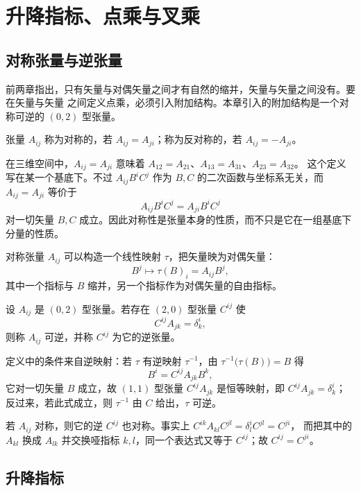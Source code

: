 \chapter{升降指标、点乘与叉乘}

\section{对称张量与逆张量}

前两章指出，只有矢量与对偶矢量之间才有自然的缩并，矢量与矢量之间没有。要在矢量与矢量
之间定义点乘，必须引入附加结构。本章引入的附加结构是一个对称可逆的 $(0,2)$ 型张量。

\begin{definition}[对称张量与反对称张量]
张量 $A_{ij}$ 称为对称的，若 $A_{ij}=A_{ji}$；称为反对称的，若 $A_{ij}=-A_{ji}$。
\end{definition}

在三维空间中，$A_{ij}=A_{ji}$ 意味着 $A_{12}=A_{21}$、$A_{13}=A_{31}$、$A_{23}=A_{32}$。
这个定义写在某一个基底下。不过 $A_{ij}B^iC^j$ 作为 $B,C$ 的二次函数与坐标系无关，而
$A_{ij}=A_{ji}$ 等价于
\[
A_{ij}B^iC^j=A_{ji}B^iC^j
\]
对一切矢量 $B,C$ 成立。因此对称性是张量本身的性质，而不只是它在一组基底下分量的性质。

对称张量 $A_{ij}$ 可以构造一个线性映射 $\tau$，把矢量映为对偶矢量：
\[
B^j\longmapsto \tau(B)_i=A_{ij}B^j ,
\]
其中一个指标与 $B$ 缩并，另一个指标作为对偶矢量的自由指标。

\begin{definition}[逆张量]
设 $A_{ij}$ 是 $(0,2)$ 型张量。若存在 $(2,0)$ 型张量 $C^{ij}$ 使
\[
C^{ij}A_{jk}=\delta^i_k ,
\]
则称 $A_{ij}$ 可逆，并称 $C^{ij}$ 为它的逆张量。
\end{definition}

定义中的条件来自逆映射：若 $\tau$ 有逆映射 $\tau^{-1}$，由 $\tau^{-1}\bigl(\tau(B)\bigr)=B$ 得
\[
B^i=C^{ij}A_{jk}B^k ,
\]
它对一切矢量 $B$ 成立，故 $(1,1)$ 型张量 $C^{ij}A_{jk}$ 是恒等映射，即 $C^{ij}A_{jk}=\delta^i_k$；
反过来，若此式成立，则 $\tau^{-1}$ 由 $C$ 给出，$\tau$ 可逆。

\begin{remark}
若 $A_{ij}$ 对称，则它的逆 $C^{ij}$ 也对称。事实上 $C^{ik}A_{kl}C^{jl}=\delta^i_lC^{jl}=C^{ji}$，
而把其中的 $A_{kl}$ 换成 $A_{lk}$ 并交换哑指标 $k,l$，同一个表达式又等于 $C^{ij}$；故
$C^{ij}=C^{ji}$。
\end{remark}

\section{升降指标}


